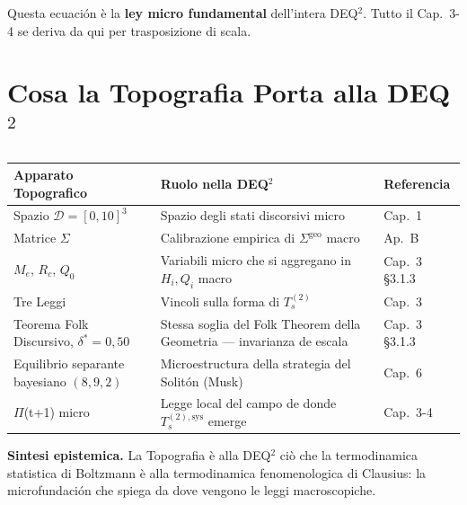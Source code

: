 \Proved{} Questa ecuación è la \textbf{ley micro fundamental}
dell'intera DEQ$^2$. Tutto il Cap.~3-4 se deriva da qui per trasposizione di
scala.



\section{Cosa la Topografia Porta alla
DEQ$^2$}\label{cosa-la-topografia-porta-alla-dequxb2}

{\def\LTcaptype{none} %
{\small\begin{longtable}[]{@{}
  >{\raggedright\arraybackslash}p{}
  >{\raggedright\arraybackslash}p{}
  >{\raggedright\arraybackslash}p{}@{}}
\toprule\noalign{}
\begin{minipage}[b]{\linewidth}\raggedright
Apparato Topografico
\end{minipage} & \begin{minipage}[b]{\linewidth}\raggedright
Ruolo nella DEQ$^2$
\end{minipage} & \begin{minipage}[b]{\linewidth}\raggedright
Referencia
\end{minipage} \\
\midrule\noalign{}
\endhead
\bottomrule\noalign{}
\endlastfoot
Spazio \(\mathcal{D} = [0, 10]^3\) & Spazio degli stati discorsivi micro
& Cap.~1 \\
Matrice \(\Sigma\) & Calibrazione empirica di \(\Sigma^{\text{geo}}\)
macro & Ap.~B \\
\(M_e\), \(R_c\), \(Q_0\) & Variabili micro che si aggregano in
\(H_i, Q_i\) macro & Cap.~3 \S{}3.1.3 \\
Tre Leggi & Vincoli sulla forma di \(T_s^{(2)}\) & Cap.~3 \\
Teorema Folk Discursivo, \(\delta^* = 0{,}50\) & Stessa soglia del Folk
Theorem della Geometria --- invarianza de escala & Cap.~3 \S{}3.1.3 \\
Equilibrio separante bayesiano \((8, 9, 2)\) & Microestructura della
strategia del Solitón (Musk) & Cap.~6 \\
$\Pi$(t+1) micro & Legge local del campo de donde \(T_s^{(2),\text{sys}}\)
emerge & Cap.~3-4 \\
\end{longtable}}
}

\Hypoth{} \textbf{Sintesi epistemica.} La Topografia è alla DEQ$^2$ ciò che
la termodinamica statistica di Boltzmann è alla termodinamica
fenomenologica di Clausius: la microfundación che spiega da dove
vengono le leggi macroscopiche.



